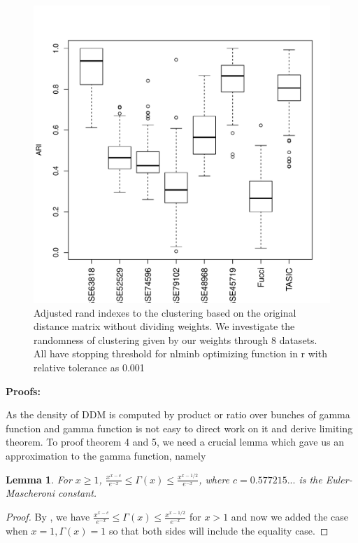 \documentclass[aoas,preprint]{imsart}
\newtheorem{lemma}{Lemma}
\begin{document}
\begin{figure}[h]
\includegraphics[scale = 0.8]{Figs/ARI.pdf}
 \caption{Adjusted rand indexes to the clustering based on the original distance matrix without dividing weights. We investigate the randomness of clustering given by our weights through 8 datasets. All have stopping threshold for nlminb optimizing function in r with relative tolerance as 0.001}
  \label{fig:1}
\end{figure}

\noindent
{\bf Proofs:}

As the density of DDM is computed by product or ratio over bunches of gamma function and gamma function is not easy to direct work on it and derive limiting theorem.
To proof theorem 4 and 5, we need a crucial lemma which gave us an approximation to the gamma function, namely

\begin{lemma}
For $x \geq 1$, $\frac{x^{x - c}}{e^{-x}} \leq \Gamma(x) \leq \frac{x^{x-1/2}}{e^{-x}}$, where $c = 0.577215...$ is the Euler-Mascheroni constant.
\end{lemma}

\begin{proof}
By \citep{ineq},  we have $\frac{x^{x - c}}{e^{-x}} \leq \Gamma(x) \leq \frac{x^{x-1/2}}{e^{-x}}$ for $x > 1$ and now we added the case when $x = 1, \Gamma(x) = 1$ so that both sides will include the equality case. 
\end{proof}
\end{document}

